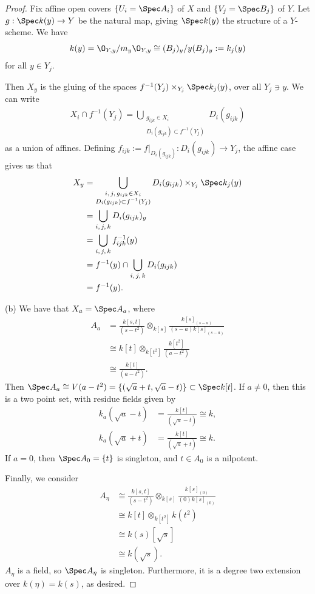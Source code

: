 \documentclass[12pt]{amsart}
\begin{document}
\begin{proof}
  Fix affine open covers $\{U_i=\Spec A_i\}$ of $X$ and $\{V_j=\Spec B_j\}$ of $Y$.
  Let $g:\Spec k(y)\to Y$ be the natural map, giving $\Spec k(y)$ the structure of a $Y$-scheme.
  We have 
  \[
    k(y)= \O_{Y,y}/m_y\O_{Y,y}\cong (B_j)_y/y(B_j)_y := k_j(y)
  \] 
  for all $y\in Y_j$.

  Then $X_y$ is the gluing of the spaces $f^{-1}(Y_j)\times_{Y_j} \Spec k_j(y)$, over all $Y_j\ni y$.
  We can write 
  \begin{align*}
    X_i\cap f^{-1}(Y_j)= \bigcup_{\substack{g_{i j k}\in X_i \\ D_i(g_{i j k})\subset f^{-1}(Y_j)}} D_i(g_{ij k})
  \end{align*}
  as a union of affines.
  Defining $f_{i j k}:=f|_{D_i(g_{i j k})}:D_i(g_{ i j k})\to Y_j$, the affine case gives us that
  \begin{align*}
    X_y &= \bigcup_{\substack{i,\,j,\, g_{ij k}\in X_i \\ D_i(g_{i j k})\subset f^{-1}(Y_j)}}
    D_i(g_{i j k})\times_{Y_j} \Spec k_j(y) \\
        &= \bigcup_{i,\, j,\, k} D_i(g_{i j k})_y \\
        &= \bigcup_{i,\, j,\, k} f_{i j k}^{-1}(y) \\
        &= f^{-1}(y)\cap \bigcup_{i, \, j, \,k} D_i(g_{ij k}) \\
        &= f^{-1}(y).
  \end{align*}

  (b) We have that $X_a=\Spec A_a$, where
  \begin{align*}
    A_a &= \frac{k[s,t]}{(s-t^2)}\otimes_{k[s]}\frac{k[s]_{(s-a)}}{(s-a)k[s]_{(s-a)}} \\
        &\cong k[t]\otimes_{k[t^2]}\frac{k[t^2]}{(a-t^2)} \\
        &\cong \frac{k[t]}{(a-t^2)}.
  \end{align*}
  Then $\Spec A_a\cong V(a-t^2)=\{(\sqrt{a}+ t,\sqrt{a}-t)\}\subset \Spec k[t]$.
  If $a\neq 0$, then this is a two point set, with residue fields given by
  \begin{align*}
    k_a(\sqrt{a}-t) &=\frac{k[t]}{(\sqrt{a}-t)}\cong k,\\
    k_a(\sqrt{a}+t) &=\frac{k[t]}{(\sqrt{a}+t)}\cong k.
  \end{align*}
  If $a=0$, then $\Spec A_0=\{t\}$ is singleton, and $t\in A_0$ is a nilpotent.

  Finally, we consider 
  \begin{align*}
    A_\eta &\cong \frac{k[s,t]}{(s-t^2)}\otimes_{k[s]}\frac{k[s]_{(0)}}{(0)k[s]_{(0)}} \\
           &\cong k[t]\otimes_{k[t^2]}k(t^2) \\
           &\cong k(s)[\sqrt{s}] \\
           &\cong k(\sqrt{s}).
  \end{align*}
  $A_\eta$ is a field, so $\Spec A_\eta$ is singleton.
  Furthermore, it is a degree two extension over $k(\eta)=k(s)$, as desired.
\end{proof}
\end{document}

